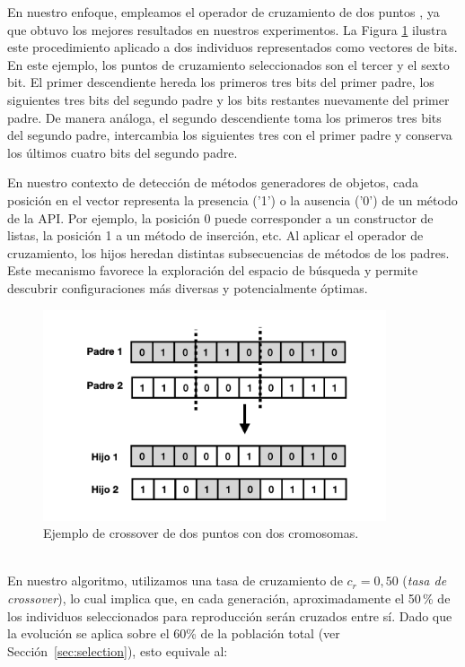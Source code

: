 En nuestro enfoque, empleamos el operador de cruzamiento de dos puntos \cite{goldberg1989genetic}, ya que obtuvo los mejores resultados en nuestros experimentos.  
La Figura \ref{fig:crossover} ilustra este procedimiento aplicado a dos individuos representados como vectores de bits.  
En este ejemplo, los puntos de cruzamiento seleccionados son el tercer y el sexto bit.  
El primer descendiente hereda los primeros tres bits del primer padre, los siguientes tres bits del segundo padre y los bits restantes nuevamente del primer padre.  
De manera análoga, el segundo descendiente toma los primeros tres bits del segundo padre, intercambia los siguientes tres con el primer padre y conserva los últimos cuatro bits del segundo padre.  

En nuestro contexto de detección de métodos generadores de objetos, cada posición en el vector representa la presencia ('1') o la ausencia ('0') de un método de la API.  
Por ejemplo, la posición 0 puede corresponder a un constructor de listas, la
posición 1 a un método de inserción, etc.  
Al aplicar el operador de cruzamiento, los hijos heredan distintas subsecuencias de métodos
de los padres. Este mecanismo favorece la exploración del espacio de búsqueda y permite descubrir configuraciones más diversas y potencialmente óptimas. 

\begin{figure}
  \centering
  \includegraphics[width=0.9\textwidth]{images/crossOver.png}
  \caption{Ejemplo de crossover de dos puntos con dos cromosomas.}
  \label{fig:crossover}
\end{figure}

\\
En nuestro algoritmo, utilizamos una tasa de cruzamiento de \( c_r = 0{,}50 \) (\emph{tasa de crossover}), 
lo cual implica que, en cada generación, aproximadamente el 50\,\% de los individuos seleccionados para reproducción serán cruzados entre sí.  
Dado que la evolución se aplica sobre el 60\% de la población total (ver Sección~\ref{sec:selection}), esto equivale al:

